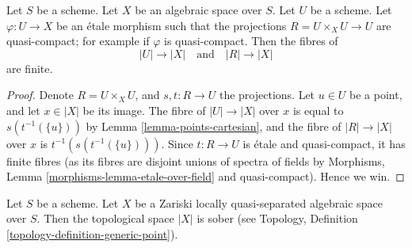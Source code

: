 \begin{lemma}
\label{lemma-finite-fibres-presentation}
Let $S$ be a scheme.
Let $X$ be an algebraic space over $S$.
Let $U$ be a scheme. Let $\varphi : U \to X$ be an \'etale morphism such that
the projections $R = U \times_X U \to U$ are quasi-compact; for example if
$\varphi$ is quasi-compact. Then the fibres of
$$
|U| \to |X|
\quad\text{and}\quad
|R| \to |X|
$$
are finite.
\end{lemma}

\begin{proof}
Denote $R = U \times_X U$, and $s, t : R \to U$ the projections.
Let $u \in U$ be a point, and let $x \in |X|$ be its image.
The fibre of $|U| \to |X|$ over $x$ is equal to
$s(t^{-1}(\{u\}))$ by
Lemma \ref{lemma-points-cartesian},
and the fibre of $|R| \to |X|$ over $x$ is $t^{-1}(s(t^{-1}(\{u\})))$.
Since $t : R \to U$ is \'etale and quasi-compact, it has finite fibres
(as its fibres are disjoint unions of spectra of fields by
Morphisms, Lemma \ref{morphisms-lemma-etale-over-field}
and quasi-compact). Hence we win.
\end{proof}

\begin{lemma}
\label{lemma-quasi-separated-sober}
Let $S$ be a scheme. Let $X$ be a Zariski locally quasi-separated
algebraic space over $S$. Then the topological space $|X|$ is sober (see
Topology, Definition \ref{topology-definition-generic-point}).
\end{lemma}


